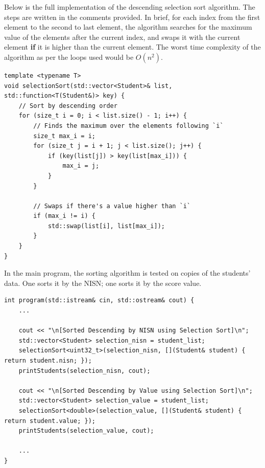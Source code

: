 \documentclass[12pt]{article}
\begin{document}
Below is the full implementation of the descending selection sort algorithm. The steps are written in the comments provided. In brief, for each index from the first element to the second to last element, the algorithm searches for the maximum value of the elements after the current index, and swaps it with the current element \textbf{if} it is higher than the current element. The worst time complexity of the algorithm as per the loops used would be $O(n^2)$.

\begin{verbatim}
template <typename T>
void selectionSort(std::vector<Student>& list, std::function<T(Student&)> key) {
    // Sort by descending order
    for (size_t i = 0; i < list.size() - 1; i++) {
        // Finds the maximum over the elements following `i`
        size_t max_i = i;
        for (size_t j = i + 1; j < list.size(); j++) {
            if (key(list[j]) > key(list[max_i])) {
                max_i = j;
            }
        }

        // Swaps if there's a value higher than `i`
        if (max_i != i) {
            std::swap(list[i], list[max_i]);
        }
    }
}
\end{verbatim}

In the main program, the sorting algorithm is tested on copies of the students' data. One sorts it by the NISN; one sorts it by the score value.

\begin{verbatim}
int program(std::istream& cin, std::ostream& cout) {
    ...

    cout << "\n[Sorted Descending by NISN using Selection Sort]\n";
    std::vector<Student> selection_nisn = student_list;
    selectionSort<uint32_t>(selection_nisn, [](Student& student) { return student.nisn; });
    printStudents(selection_nisn, cout);

    cout << "\n[Sorted Descending by Value using Selection Sort]\n";
    std::vector<Student> selection_value = student_list;
    selectionSort<double>(selection_value, [](Student& student) { return student.value; });
    printStudents(selection_value, cout);

    ...
}
\end{verbatim}
\end{document}

